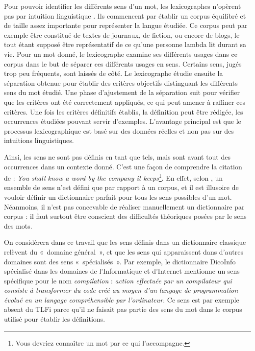 Pour pouvoir identifier les différents sens d'un mot, les lexicographes
n'opèrent pas par intuition linguistique \citep{kilgarriff1997don}. Ils
commencent par établir un corpus équilibré et de taille assez importante pour
représenter la langue étudiée. Ce corpus peut par exemple être constitué de
textes de journaux, de fiction, ou encore de blogs, le tout étant supposé être
représentatif de ce qu'une personne lambda lit durant sa vie. Pour un mot
donné, le lexicographe examine ses différents usages dans ce corpus dans le but
de séparer ces différents usages en sens. Certains sens, jugés trop peu
fréquents, sont laissés de côté. Le lexicographe étudie ensuite la séparation
obtenue pour établir des critères objectifs distinguant les différents sens du
mot étudié. Une phase d'ajustement de la séparation suit pour vérifier que les
critères ont été correctement appliqués, ce qui peut amener à raffiner ces
critères. Une fois les critères définitifs établis, la définition peut être
rédigée, les occurrences étudiées pouvant servir d'exemples.  L'avantage
principal est que le processus lexicographique est basé sur des données réelles
et non pas sur des intuitions linguistiques.


Ainsi, les sens ne sont pas définis en tant que tels, mais sont avant tout des
occurrences dans un contexte donné. C'est une façon de comprendre la citation
de \citep{firth1957synopsys} : \emph{You shall know a word by the company it
keeps}\footnote{Vous devriez connaître un mot par ce qui l'accompagne.}. En
effet, selon \citep{kilgarriff1997don}, un ensemble de sens n'est défini que
par rapport à un corpus, et il est illusoire de vouloir définir un dictionnaire
parfait pour tous les sens possibles d'un mot.  Néanmoins, il n'est pas
concevable de réaliser manuellement un dictionnaire par corpus : il faut
surtout être conscient des difficultés théoriques posées par le sens des mots.

On considèrera dans ce travail que les sens définis dans un dictionnaire
classique relèvent du «~domaine général~», et que les sens qui apparaissent
dans d'autres domaines sont des sens «~spécialisés~». Par exemple, le
dictionnaire DicoInfo \citep{corpusolst} spécialisé dans les domaines de
l'Informatique et d'Internet mentionne un sens spécifique pour le nom
\emph{compilation} : \emph{action effectuée par un compilateur qui consiste à
    transformer du code créé au moyen d'un langage de programmation évolué en
un langage compréhensible par l'ordinateur}. Ce sens est par exemple absent du
TLFi \citep{TLFi} parce qu'il ne faisait pas partie des sens du mot dans le
corpus utilisé pour établir les définitions.

